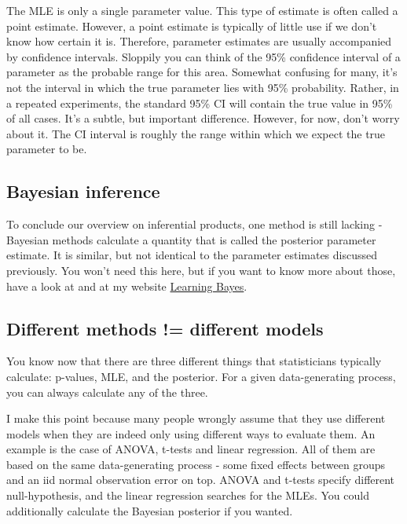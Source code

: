 \documentclass[a4paper,twoside]{tufte-book}\usepackage[]{graphicx}\usepackage[]{color}
\begin{document}
The MLE is only a single parameter value. This type of estimate is often called a point estimate. However, a point estimate is typically of little use if we don't know how certain it is. Therefore, parameter estimates are usually accompanied by confidence intervals. Sloppily you can think of the 95\% confidence interval of a parameter as the probable range for this area. Somewhat confusing for many, it's not the interval in which the true parameter lies with 95\% probability. Rather, in a repeated experiments, the standard 95\% CI will contain the true value in 95\% of all cases. It's a subtle, but important difference. However, for now, don't worry about it. The CI interval is roughly the range within which we expect the true parameter to be. 

\subsection{Bayesian inference}

To conclude our overview on inferential products, one method is still lacking - Bayesian methods calculate a quantity that is called the posterior parameter estimate. It is similar, but not identical to the parameter estimates discussed previously. You won't need this here, but if you want to know more about those, have a look at \citep{Gelman-BayesianDataAnalysis-2003} and at my website \href{http://florianhartig.github.io/LearningBayes/}{Learning Bayes}.

\subsection{Different methods != different models}

You know now that there are three different things that statisticians typically calculate: p-values, MLE, and the posterior. For a given data-generating process, you can always calculate any of the three.

I make this point because many people wrongly assume that they use different models when they are indeed only using different ways to evaluate them. An example is the case of ANOVA, t-tests and linear regression. All of them are based on the same data-generating process - some fixed effects between groups and an iid normal observation error on top. ANOVA and t-tests specify different null-hypothesis, and the linear regression searches for the MLEs. You could additionally calculate the Bayesian posterior if you wanted.
\end{document}
